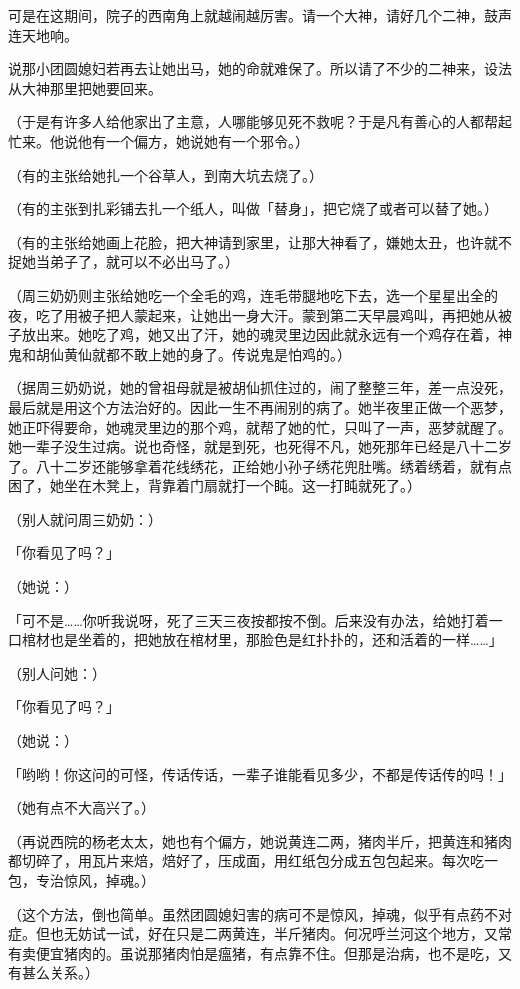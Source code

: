 \documentclass[UTF8]{ctexart}
\begin{document}
可是在这期间，院子的西南角上就越闹越厉害。请一个大神，请好几个二神，鼓声连天地响。

说那小团圆媳妇若再去让她出马，她的命就难保了。所以请了不少的二神来，设法从大神那里把她要回来。

（于是有许多人给他家出了主意，人哪能够见死不救呢？于是凡有善心的人都帮起忙来。他说他有一个偏方，她说她有一个邪令。）

（有的主张给她扎一个谷草人，到南大坑去烧了。）

（有的主张到扎彩铺去扎一个纸人，叫做「替身」，把它烧了或者可以替了她。）

（有的主张给她画上花脸，把大神请到家里，让那大神看了，嫌她太丑，也许就不捉她当弟子了，就可以不必出马了。）

（周三奶奶则主张给她吃一个全毛的鸡，连毛带腿地吃下去，选一个星星出全的夜，吃了用被子把人蒙起来，让她出一身大汗。蒙到第二天早晨鸡叫，再把她从被子放出来。她吃了鸡，她又出了汗，她的魂灵里边因此就永远有一个鸡存在着，神鬼和胡仙黄仙就都不敢上她的身了。传说鬼是怕鸡的。）

（据周三奶奶说，她的曾祖母就是被胡仙抓住过的，闹了整整三年，差一点没死，最后就是用这个方法治好的。因此一生不再闹别的病了。她半夜里正做一个恶梦，她正吓得要命，她魂灵里边的那个鸡，就帮了她的忙，只叫了一声，恶梦就醒了。她一辈子没生过病。说也奇怪，就是到死，也死得不凡，她死那年已经是八十二岁了。八十二岁还能够拿着花线绣花，正给她小孙子绣花兜肚嘴。绣着绣着，就有点困了，她坐在木凳上，背靠着门扇就打一个盹。这一打盹就死了。）

（别人就问周三奶奶：）

「你看见了吗？」

（她说：）

「可不是……你听我说呀，死了三天三夜按都按不倒。后来没有办法，给她打着一口棺材也是坐着的，把她放在棺材里，那脸色是红扑扑的，还和活着的一样……」

（别人问她：）

「你看见了吗？」

（她说：）

「哟哟！你这问的可怪，传话传话，一辈子谁能看见多少，不都是传话传的吗！」

（她有点不大高兴了。）

（再说西院的杨老太太，她也有个偏方，她说黄连二两，猪肉半斤，把黄连和猪肉都切碎了，用瓦片来焙，焙好了，压成面，用红纸包分成五包包起来。每次吃一包，专治惊风，掉魂。）

（这个方法，倒也简单。虽然团圆媳妇害的病可不是惊风，掉魂，似乎有点药不对症。但也无妨试一试，好在只是二两黄连，半斤猪肉。何况呼兰河这个地方，又常有卖便宜猪肉的。虽说那猪肉怕是瘟猪，有点靠不住。但那是治病，也不是吃，又有甚么关系。）
\end{document}
